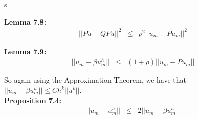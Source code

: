 s\documentclass[../../main.tex]{subfiles}
\begin{document}
\textbf{Lemma 7.8:}
\begin{eqnarray*}
||Pu - QPu||^{2} &\leq & {\rho}^{2} ||u_{m} - Pu_{m}||^{2}
\end{eqnarray*}

\begin{comment}
\textbf{Proof:}

Now using Lemma 7.7:
\begin{eqnarray*}
||Pu - \beta u_{m}^{h}||^{2} &=& \sum_{j\neq m} \left(\frac{\lambda_{m}}{|\lambda_{m} - \lambda_{j}^{h}|}\right)^{2} ( u_{m} - Pu_{m} ,u_{j}^{h})^{2}\\
				&\leq & \rho^{2} \sum_{j\neq m} ( u_{m} - Pu_{m} ,u_{j}^{h})^{2} \\
				&\leq & \rho^{2} \sum_{j=1}^{N} ( u_{m} - Pu_{m} ,u_{j}^{h})^{2} \\
				& = & \rho^{2} ||u - Pu||^{2}\\
\end{eqnarray*}
\qed
\end{comment}

\textbf{Lemma 7.9:}
\begin{eqnarray*}
||u_{m} - \beta u_{m}^{h}|| &\leq & \left(1+\rho\right)||u_{m}-Pu_{m}||
\end{eqnarray*}

\begin{comment}
\textbf{Proof:}
\begin{eqnarray*}
||u_{m} - \beta u_{m}^{h}|| & \leq & ||u_{m}-Pu_{m}|| + ||Pu_{m} - \beta u_{m}^{h}|| \\
			& \leq & \left(1+\rho\right)||u_{m}-Pu_{m}|| \ \ \textrm{ (by Lemma 7.8)}
\end{eqnarray*}
\qed
\end{comment}



So again using the Approximation Theorem, we have that $||u_{m} - \beta u_{m}^{h}||\leq Ch^{k}||u^{k}||$.\\


\textbf{Proposition 7.4:}
\begin{eqnarray*}
||u_{m} -  u_{m}^{h}|| &\leq & 2||u_{m}-\beta u^{h}_{m}||
\end{eqnarray*}

\begin{comment}
\textbf{Proof:}
\begin{eqnarray*}
||u_{m} - u_{m}^{h}|| &=& ||u_{m} - \beta u_{m}^{h} + \beta u_{m}^{h} - u_{m}^{h}|| \\
					& \leq & ||u_{m} - \beta u_{m}^{h}|| + ||\beta u_{m}^{h} - u_{m}^{h}|| \\
					& = & 2||u_{m} - \beta u_{m}^{h}||	
\end{eqnarray*}
\qed
\end{comment}
\end{document}
